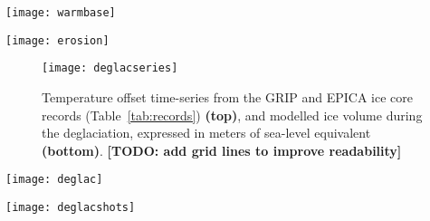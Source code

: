 \documentclass[tc, manuscript]{copernicus}
\newcommand{\note}[1]{\textbf{[NOTE: #1]}}
\newcommand{\todo}[1]{\textbf{[TODO: #1]}}
\begin{document}
\begin{figure*}
  \texttt{[image: warmbase]}
  \caption{Modelled duration of warm-based ice cover during the last
           120\,kyr. Long ice cover durations combined with basal
           temperatures at the pressure-melting point may explain the strong
           glacial erosional imprint of the Skeena Mountains (SM) landscape.
           Hatches indicate areas that were covered by cold ice only.
           \note{indicate location of Skeena Mountains.}}
  \label{fig:warmbase}
\end{figure*}

\begin{figure*}
  \texttt{[image: erosion]}
  \caption{Modelled cumulative basal displacement (integrand of basal velocity)
           over the last 120\,kyr.
           \note{I am still unsure about the use of this figure. I may
                 remove it from this paper and keep the idea for later use.}}
  \label{fig:erosion}
\end{figure*}

\begin{figure}
  \texttt{[image: deglacseries]}
  \caption{Temperature offset time-series from the GRIP and EPICA ice core
           records (Table~\ref{tab:records}) \textbf{(top)}, and modelled ice
           volume during the deglaciation, expressed in meters of sea-level
           equivalent \textbf{(bottom)}.
           \todo{add grid lines to improve readability}}
  \label{fig:deglacseries}
\end{figure}

\begin{figure*}
  \texttt{[image: deglac]}
  \caption{Modelled age of the last deglaciation. Areas where the MIS~4 glacial
           advance exceeded the last glacial maximum advanced are marked in
           green. Hatches denote the Younger Dryas re-advance, which is more
           pronounced in the GRIP-driven simulation.}
  \label{fig:deglac}
\end{figure*}

\begin{figure*}
  \texttt{[image: deglacshots]}
  \caption{Snapshots of modelled surface topography (200\,m contours)
           and surface velocity (colour mapping) from the GRIP simulation,
           corresponding to the last glacial maximum (-19.5 kyr) and the last
           deglaciation.
           \note{should we have a similar figure using EPICA?}}
  \label{fig:deglacshots}
\end{figure*}
\end{document}
